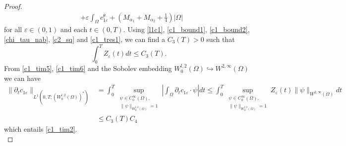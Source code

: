 \documentclass[a4paper,10pt]{article}
\theoremstyle{definition}
\begin{document}
\begin{proof}
\begin{align*}
    & + \varepsilon \int_\Omega c_{1\varepsilon}^\theta + (M_{\alpha_1} + M_{\alpha_2} + \tfrac{1}{4}) |\Omega|
  \end{align*}
for all $\varepsilon \in (0, 1)$ and each $t \in (0, T)$. Using \eqref{l1c1}, \eqref{c1_bound1}, \eqref{c1_bound2}, \eqref{chi_tau_nab}, \eqref{c2_sq} and \eqref{c1_tres1}, we can find a $C_3(T) > 0$ such that
\begin{equation}
 \label{c1_tim6}
  \int_0^T Z_\varepsilon(t) dt \leq C_3(T).
\end{equation}
\noindent
From \eqref{c1_tim5}, \eqref{c1_tim6} and the Sobolev embedding $W_0^{l, 2}(\Omega) \hookrightarrow W^{2, \infty}(\Omega)$ we can have
\begin{align*}
   \|\partial_t c_{1\varepsilon}\|_{L^1(0, T; (W_0^{l, 2}(\Omega))^\ast)} & = \int_0^T \sup_{\substack{\psi \in C_0^\infty(\Omega),\\ \|\psi\|_{W^{l, 2}_0(\Omega)} = 1}} \left|\int_\Omega \partial_t c_{1\varepsilon} \cdot \psi \right| dt  \leq \int_0^T \sup_{\substack{\psi \in C_0^\infty(\Omega),\\ \|\psi\|_{W^{l, 2}_0(\Omega)} = 1}} Z_\varepsilon(t) \|\psi\|_{W^{2, \infty}(\Omega)} dt  \\[5pt]
   & \leq C_3(T) C_4
  \end{align*}
which entails \eqref{c1_tim2}.\\[-2ex]


\end{proof}
\end{document}
